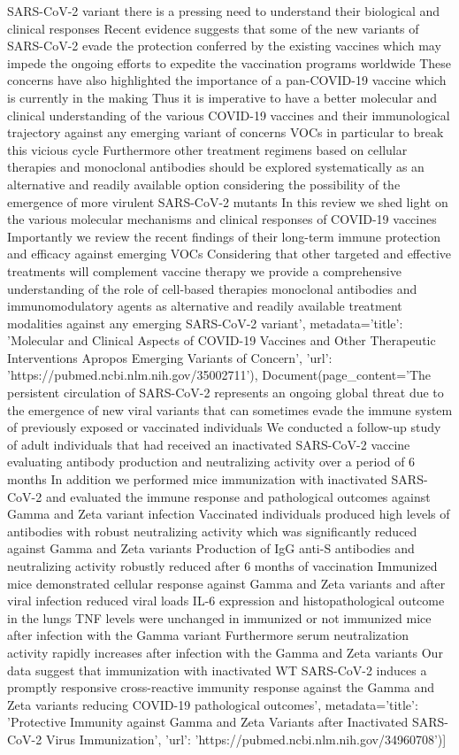 SARS-CoV-2 variant there is a pressing need to understand their biological and clinical responses Recent evidence suggests that some of the new variants of SARS-CoV-2 evade the protection conferred by the existing vaccines which may impede the ongoing efforts to expedite the vaccination programs worldwide These concerns have also highlighted the importance of a pan-COVID-19 vaccine which is currently in the making Thus it is imperative to have a better molecular and clinical understanding of the various COVID-19 vaccines and their immunological trajectory against any emerging variant of concerns VOCs in particular to break this vicious cycle Furthermore other treatment regimens based on cellular therapies and monoclonal antibodies should be explored systematically as an alternative and readily available option considering the possibility of the emergence of more virulent SARS-CoV-2 mutants In this review we shed light on the various molecular mechanisms and clinical responses of COVID-19 vaccines Importantly we review the recent findings of their long-term immune protection and efficacy against emerging VOCs Considering that other targeted and effective treatments will complement vaccine therapy we provide a comprehensive understanding of the role of cell-based therapies monoclonal antibodies and immunomodulatory agents as alternative and readily available treatment modalities against any emerging SARS-CoV-2 variant', metadata={'title': 'Molecular and Clinical Aspects of COVID-19 Vaccines and Other Therapeutic Interventions Apropos Emerging Variants of Concern', 'url': 'https://pubmed.ncbi.nlm.nih.gov/35002711'}), Document(page\_content='The persistent circulation of SARS-CoV-2 represents an ongoing global threat due to the emergence of new viral variants that can sometimes evade the immune system of previously exposed or vaccinated individuals We conducted a follow-up study of adult individuals that had received an inactivated SARS-CoV-2 vaccine evaluating antibody production and neutralizing activity over a period of 6 months In addition we performed mice immunization with inactivated SARS-CoV-2 and evaluated the immune response and pathological outcomes against Gamma and Zeta variant infection Vaccinated individuals produced high levels of antibodies with robust neutralizing activity which was significantly reduced against Gamma and Zeta variants Production of IgG anti-S antibodies and neutralizing activity robustly reduced after 6 months of vaccination Immunized mice demonstrated cellular response against Gamma and Zeta variants and after viral infection reduced viral loads IL-6 expression and histopathological outcome in the lungs TNF levels were unchanged in immunized or not immunized mice after infection with the Gamma variant Furthermore serum neutralization activity rapidly increases after infection with the Gamma and Zeta variants Our data suggest that immunization with inactivated WT SARS-CoV-2 induces a promptly responsive cross-reactive immunity response against the Gamma and Zeta variants reducing COVID-19 pathological outcomes', metadata={'title': 'Protective Immunity against Gamma and Zeta Variants after Inactivated SARS-CoV-2 Virus Immunization', 'url': 'https://pubmed.ncbi.nlm.nih.gov/34960708'})]

